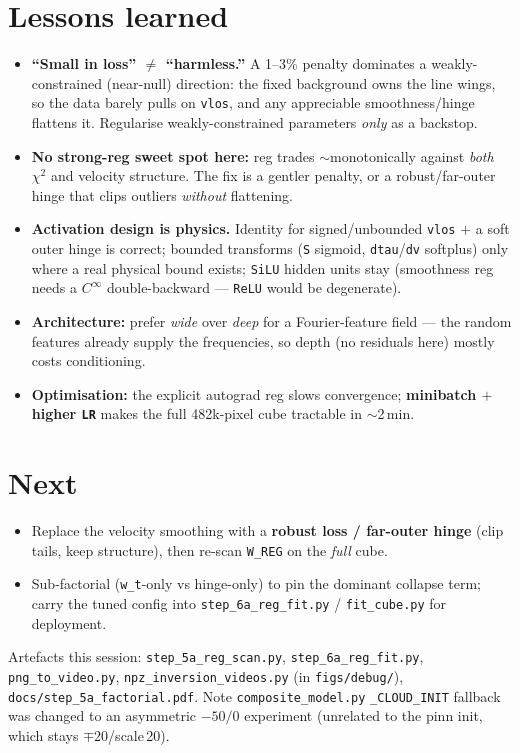 \documentclass[10pt,a4paper]{article}
\newcommand{\co}[1]{{\small\texttt{#1}}}
\begin{document}
\section{Lessons learned}
\begin{itemize}
\item \textbf{``Small in loss'' $\ne$ ``harmless.''} A 1--3\% penalty dominates a weakly-constrained (near-null) direction: the fixed background owns the line wings, so the data barely pulls on \co{vlos}, and any appreciable smoothness/hinge flattens it. Regularise weakly-constrained parameters \emph{only} as a backstop.
\item \textbf{No strong-reg sweet spot here:} reg trades $\sim$monotonically against \emph{both} $\chi^2$ and velocity structure. The fix is a gentler penalty, or a robust/far-outer hinge that clips outliers \emph{without} flattening.
\item \textbf{Activation design is physics.} Identity for signed/unbounded \co{vlos} $+$ a soft outer hinge is correct; bounded transforms (\co{S} sigmoid, \co{dtau}/\co{dv} softplus) only where a real physical bound exists; \co{SiLU} hidden units stay (smoothness reg needs a $C^\infty$ double-backward --- \co{ReLU} would be degenerate).
\item \textbf{Architecture:} prefer \emph{wide} over \emph{deep} for a Fourier-feature field --- the random features already supply the frequencies, so depth (no residuals here) mostly costs conditioning.
\item \textbf{Optimisation:} the explicit autograd reg slows convergence; \textbf{minibatch $+$ higher \co{LR}} makes the full 482k-pixel cube tractable in $\sim$2\,min.
\end{itemize}

\section{Next}
\begin{itemize}
\item Replace the velocity smoothing with a \textbf{robust loss / far-outer hinge} (clip tails, keep structure), then re-scan \co{W\_REG} on the \emph{full} cube.
\item Sub-factorial (\co{w\_t}-only vs hinge-only) to pin the dominant collapse term; carry the tuned config into \co{step\_6a\_reg\_fit.py} / \co{fit\_cube.py} for deployment.
\end{itemize}

\vspace{1pt}{\footnotesize\color{gry}\rule{\textwidth}{0.4pt}}
{\sffamily\color{gry}\footnotesize Artefacts this session: \co{step\_5a\_reg\_scan.py}, \co{step\_6a\_reg\_fit.py}, \co{png\_to\_video.py}, \co{npz\_inversion\_videos.py} (in \co{figs/debug/}), \co{docs/step\_5a\_factorial.pdf}. Note \co{composite\_model.py} \co{\_CLOUD\_INIT} fallback was changed to an asymmetric $-50/0$ experiment (unrelated to the pinn init, which stays $\mp20$/scale\,20).}
\end{document}
